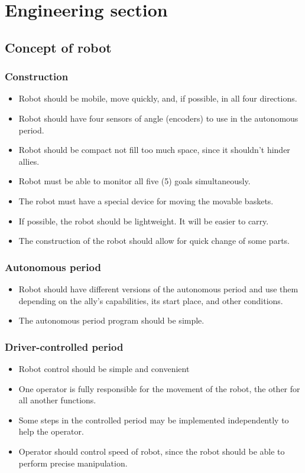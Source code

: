 \section{Engineering section}
\subsection{Concept of robot}
\subsubsection{Construction}
\begin{itemize}
	\item Robot should be mobile, move quickly, and, if possible, in all four directions.
	\item Robot should have four sensors of angle (encoders) to use in the autonomous period.
	\item Robot should be compact not fill too much space, since it shouldn't hinder allies.
	\item Robot must be able to monitor all five (5) goals simultaneously. 
	\item The robot must have a special device for moving the movable baskets.
	\item If possible, the robot should be lightweight. It will be easier to carry.
	\item The construction of the robot should allow for quick change of some parts.
\end{itemize}
\subsubsection{Autonomous period}
\begin{itemize}
	\item Robot should have different versions of the autonomous period and use them depending on the ally's capabilities, its start place, and other conditions.
	\item The autonomous period program should be simple.
\end{itemize}
\subsubsection{Driver-controlled period}
\begin{itemize}
	\item Robot control should be simple and convenient
	\item One operator is fully responsible for the movement of the robot, the other for all another functions.
	\item Some steps in the controlled period may be implemented independently to help the operator.
	\item Operator should control speed of robot, since the robot should be able to perform precise manipulation.
\end{itemize}
\fillpage

